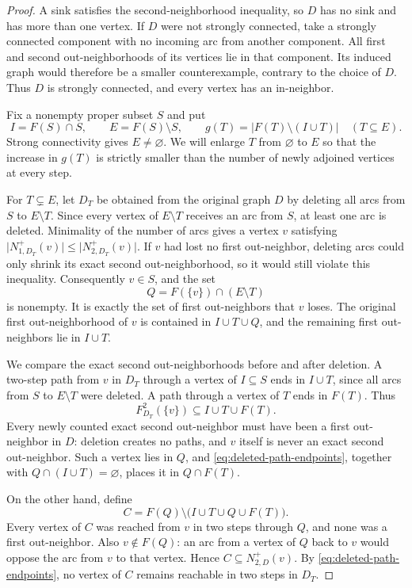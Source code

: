 \documentclass[11pt]{article}
\theoremstyle{remark}
\newcommand{\abs}[1]{\lvert #1\rvert}
\begin{document}
\begin{proof}
A sink satisfies the second-neighborhood inequality, so $D$ has no sink
and has more than one vertex.  If $D$ were not strongly connected, take
a strongly connected component with no incoming arc from another component.
All first and second out-neighborhoods of its vertices lie in that
component.  Its induced graph would therefore be a smaller counterexample,
contrary to the choice of $D$.  Thus $D$ is strongly connected, and every
vertex has an in-neighbor.

Fix a nonempty proper subset $S$ and put
\[
  I=F(S)\cap S,\qquad E=F(S)\setminus S,
  \qquad g(T)=\abs{F(T)\setminus(I\cup T)}\quad(T\subseteq E).
\]
Strong connectivity gives $E\ne\varnothing$.  We will enlarge $T$ from
$\varnothing$ to $E$ so that the increase in $g(T)$ is strictly smaller
than the number of newly adjoined vertices at every step.

For $T\subsetneq E$, let $D_T$ be obtained from the original graph $D$
by deleting all arcs from $S$ to $E\setminus T$.  Since every vertex of
$E\setminus T$ receives an arc from $S$, at least one arc is deleted.
Minimality of the number of arcs gives a vertex $v$ satisfying
$\abs{N_{1,D_T}^+(v)}\le\abs{N_{2,D_T}^+(v)}$.
If $v$ had lost no first out-neighbor, deleting arcs could only shrink
its exact second out-neighborhood, so it would still violate this
inequality.  Consequently $v\in S$, and the set
\[
  Q=F(\{v\})\cap(E\setminus T)
\]
is nonempty.  It is exactly the set of first out-neighbors that $v$ loses.
The original first out-neighborhood of $v$ is contained in $I\cup T\cup Q$,
and the remaining first out-neighbors lie in $I\cup T$.

We compare the exact second out-neighborhoods before and after deletion.
A two-step path from $v$ in $D_T$ through a vertex of $I\subseteq S$
ends in $I\cup T$, since all arcs from $S$ to $E\setminus T$ were
deleted.  A path through a vertex of $T$ ends in $F(T)$.  Thus
\begin{equation}
\label{eq:deleted-path-endpoints}
  F_{D_T}^2(\{v\})\subseteq I\cup T\cup F(T).
\end{equation}
Every newly counted exact second out-neighbor must have been a first
out-neighbor in $D$: deletion creates no paths, and $v$ itself is never
an exact second out-neighbor.  Such a vertex lies in $Q$, and
\eqref{eq:deleted-path-endpoints}, together with
$Q\cap(I\cup T)=\varnothing$, places it in $Q\cap F(T)$.

On the other hand, define
\[
  C=F(Q)\setminus\bigl(I\cup T\cup Q\cup F(T)\bigr).
\]
Every vertex of $C$ was reached from $v$ in two steps through $Q$, and
none was a first out-neighbor.  Also $v\notin F(Q)$: an arc from a
vertex of $Q$ back to $v$ would oppose the arc from $v$ to that vertex.
Hence $C\subseteq N_{2,D}^+(v)$.  By
\eqref{eq:deleted-path-endpoints}, no vertex of $C$ remains reachable
in two steps in $D_T$.


\end{proof}
\end{document}
